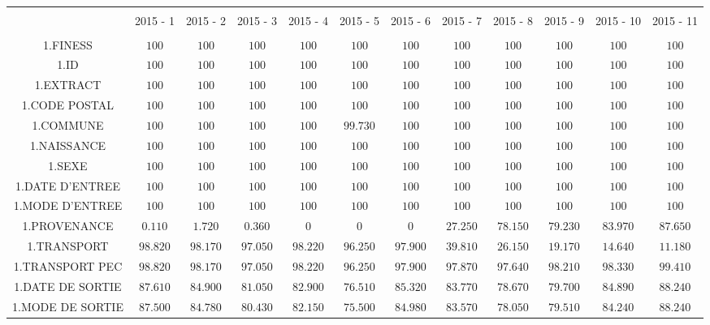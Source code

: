 \documentclass[]{article}
\begin{document}
\begin{table}[!htbp] \centering 
  \caption{} 
  \label{} 
\begin{tabular}{@{\extracolsep{5pt}} cccccccccccc} 
\\[-1.8ex]\hline 
\hline \\[-1.8ex] 
 & 2015 - 1 & 2015 - 2 & 2015 - 3 & 2015 - 4 & 2015 - 5 & 2015 - 6 & 2015 - 7 & 2015 - 8 & 2015 - 9 & 2015 - 10 & 2015 - 11 \\ 
\hline \\[-1.8ex] 
1.FINESS & $100$ & $100$ & $100$ & $100$ & $100$ & $100$ & $100$ & $100$ & $100$ & $100$ & $100$ \\ 
1.ID & $100$ & $100$ & $100$ & $100$ & $100$ & $100$ & $100$ & $100$ & $100$ & $100$ & $100$ \\ 
1.EXTRACT & $100$ & $100$ & $100$ & $100$ & $100$ & $100$ & $100$ & $100$ & $100$ & $100$ & $100$ \\ 
1.CODE POSTAL & $100$ & $100$ & $100$ & $100$ & $100$ & $100$ & $100$ & $100$ & $100$ & $100$ & $100$ \\ 
1.COMMUNE & $100$ & $100$ & $100$ & $100$ & $99.730$ & $100$ & $100$ & $100$ & $100$ & $100$ & $100$ \\ 
1.NAISSANCE & $100$ & $100$ & $100$ & $100$ & $100$ & $100$ & $100$ & $100$ & $100$ & $100$ & $100$ \\ 
1.SEXE & $100$ & $100$ & $100$ & $100$ & $100$ & $100$ & $100$ & $100$ & $100$ & $100$ & $100$ \\ 
1.DATE D'ENTREE & $100$ & $100$ & $100$ & $100$ & $100$ & $100$ & $100$ & $100$ & $100$ & $100$ & $100$ \\ 
1.MODE D'ENTREE & $100$ & $100$ & $100$ & $100$ & $100$ & $100$ & $100$ & $100$ & $100$ & $100$ & $100$ \\ 
1.PROVENANCE & $0.110$ & $1.720$ & $0.360$ & $0$ & $0$ & $0$ & $27.250$ & $78.150$ & $79.230$ & $83.970$ & $87.650$ \\ 
1.TRANSPORT & $98.820$ & $98.170$ & $97.050$ & $98.220$ & $96.250$ & $97.900$ & $39.810$ & $26.150$ & $19.170$ & $14.640$ & $11.180$ \\ 
1.TRANSPORT PEC & $98.820$ & $98.170$ & $97.050$ & $98.220$ & $96.250$ & $97.900$ & $97.870$ & $97.640$ & $98.210$ & $98.330$ & $99.410$ \\ 
1.DATE DE SORTIE & $87.610$ & $84.900$ & $81.050$ & $82.900$ & $76.510$ & $85.320$ & $83.770$ & $78.670$ & $79.700$ & $84.890$ & $88.240$ \\ 
1.MODE DE SORTIE & $87.500$ & $84.780$ & $80.430$ & $82.150$ & $75.500$ & $84.980$ & $83.570$ & $78.050$ & $79.510$ & $84.240$ & $88.240$ \\ 

\end{tabular}
\end{table}
\end{document}
